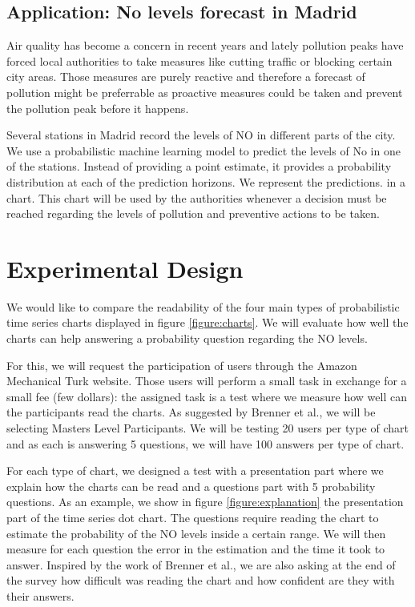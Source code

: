 \documentclass[a4paper,3p,sort&compress]{elsarticle}
\begin{document}
\subsection{Application: No levels forecast in Madrid}

Air quality has become a concern in recent years and lately pollution peaks have forced local authorities to take measures like cutting traffic or blocking certain city areas. Those measures are purely reactive and therefore a forecast of pollution might be preferrable as proactive measures could be taken and prevent the pollution peak before it happens.

Several stations in Madrid record the levels of NO in different parts of the city. We use a probabilistic
machine learning model to predict the levels of No in one of the stations. Instead of providing a point estimate, it provides a 
probability distribution at each of the prediction horizons. We represent the predictions. in a chart. This chart will be used by the
authorities whenever a decision must be reached regarding the levels of pollution and preventive actions to be taken.

\section{Experimental Design}
\label{sec:exp_design}

We would like to compare the readability of the four main types of probabilistic time series charts displayed in figure 
\ref{figure:charts}. We will evaluate how well the charts can help answering a probability question regarding the NO levels.

For this, we will request the participation of users through the Amazon Mechanical Turk website. Those users will perform a small task
in exchange for a small fee (few dollars): the assigned task is a test where we measure how well can the participants read the charts.
As suggested by Brenner et al., we will be selecting Masters Level Participants. We will be testing 20 users per type of chart 
and as each is answering 5 questions, we will have 100 answers per type of chart.

For each type of chart, we designed a test with a presentation part where we explain how the charts can be read and a questions part
with 5 probability questions. As an example, we show in figure \ref{figure:explanation} the presentation part of the time series 
dot chart. The questions
require reading the chart to estimate the probability of the NO levels inside a certain range. We will then measure for each question
the error in the estimation and the time it took to answer. Inspired by the work of Brenner et al., we are also asking at the end of 
the survey how difficult was reading the chart and how confident are they with their answers. 
\end{document}
